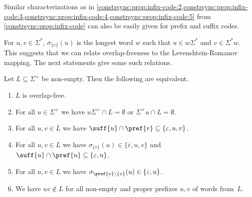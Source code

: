 Similar characterizations as in \cref{constrsync:prop:infix-code:2,constrsync:prop:infix-code:3,constrsync:prop:infix-code:4,constrsync:prop:infix-code:5} 
from \cref{constrsync:prop:infix-code} can also be easily given for prefix and suffix codes.

For $u,v \in \Sigma^*$, $\sigma_{\{v\}}(u)$ is the longest word $w$
such that $u \in w\Sigma^*$ and $v \in \Sigma^* w$. This suggests that we can relate
overlap-freeness to the Levenshtein-Romanov mapping. The next statements give some such relations.

\begin{proposition} \label{constrsync:prop:overlap-free}
	Let $L \subseteq \Sigma^+$ be non-empty. Then the following are equivalent.
	\begin{enumerate}
		\item \label{constrsync:prop:overlap-free:1} $L$ is overlap-free.
		
		\item \label{constrsync:prop:overlap-free:3} For all $u \in \Sigma^+$ we 
		have $u\Sigma^+\cap L = \emptyset$ or $\Sigma^+ u \cap L = \emptyset$.
		
		\item \label{constrsync:prop:overlap-free:2} For all $u,v \in L$ we 
		have $\suff{u} \cap \pref{v} \subseteq \{\varepsilon, u, v\}$.
		
		\item \label{constrsync:prop:overlap-free:2a} For all $u,v \in L$
		we have $\sigma_{\{v\}}(u) \in \{\varepsilon, u, v\}$ and $\suff{u}\cap \pref{u} \subseteq \{\varepsilon, u\}$.	
				
		\item \label{constrsync:prop:overlap-free:2aa} For all $u,v \in L$ we have $\sigma_{\pref{v}\setminus\{v\}}(u) \in \{\varepsilon, u\}$.
		
		\item \label{constrsync:prop:overlap-free:3a} We have $uv \notin L$ for all non-empty and proper prefixes $u,v$ of words from~$L$.
	\end{enumerate}
\end{proposition}
